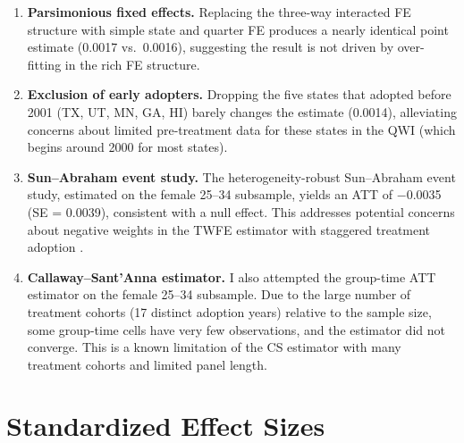 \documentclass[12pt]{article}
\begin{document}
\begin{enumerate}
\item \textbf{Parsimonious fixed effects.} Replacing the three-way interacted FE structure with simple state and quarter FE produces a nearly identical point estimate (0.0017 vs.\ 0.0016), suggesting the result is not driven by over-fitting in the rich FE structure.

\item \textbf{Exclusion of early adopters.} Dropping the five states that adopted before 2001 (TX, UT, MN, GA, HI) barely changes the estimate (0.0014), alleviating concerns about limited pre-treatment data for these states in the QWI (which begins around 2000 for most states).

\item \textbf{Sun--Abraham event study.} The heterogeneity-robust Sun--Abraham event study, estimated on the female 25--34 subsample, yields an ATT of $-$0.0035 (SE = 0.0039), consistent with a null effect. This addresses potential concerns about negative weights in the TWFE estimator with staggered treatment adoption \citep{goodmanbacon2021, sunab2021}.

\item \textbf{Callaway--Sant'Anna estimator.} I also attempted the \citet{callaway2021} group-time ATT estimator on the female 25--34 subsample. Due to the large number of treatment cohorts (17 distinct adoption years) relative to the sample size, some group-time cells have very few observations, and the estimator did not converge. This is a known limitation of the CS estimator with many treatment cohorts and limited panel length.
\end{enumerate}


\section{Standardized Effect Sizes}
\label{sec:sde}


\end{document}
